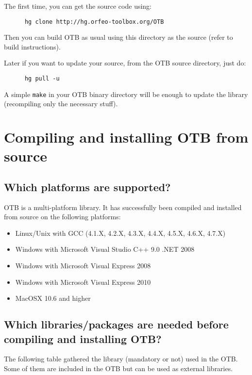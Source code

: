 The first time, you can get the source code using:
\begin{verbatim}
      hg clone http://hg.orfeo-toolbox.org/OTB
\end{verbatim}

Then you can build OTB as usual using this directory as the source (refer to build instructions).

Later if you want to update your source, from the OTB source directory, just do:
\begin{verbatim}
      hg pull -u
\end{verbatim}

A simple \texttt{make} in your OTB binary directory will be enough to update the library (recompiling only the necessary stuff).


\section{Compiling and installing OTB from source}
\label{sec:FAQInstall}
\subsection{Which platforms are supported?}
OTB is a multi-platform library. It has successfully been  compiled and installed from source on
the following platforms:
\begin{itemize}
  \item Linux/Unix with GCC (4.1.X, 4.2.X, 4.3.X, 4.4.X, 4.5.X, 4.6.X, 4.7.X)
  \item Windows with Microsoft Visual Studio C++ 9.0 .NET 2008
  \item Windows with Microsoft Visual Express 2008
  \item Windows with Microsoft Visual Express 2010
  \item MacOSX 10.6 and higher
\end{itemize}

\subsection{Which libraries/packages are needed before compiling and installing
 OTB?}
The following table gathered the library (mandatory or not) used in the OTB. Some of them are included in the OTB but can be used as external libraries.

